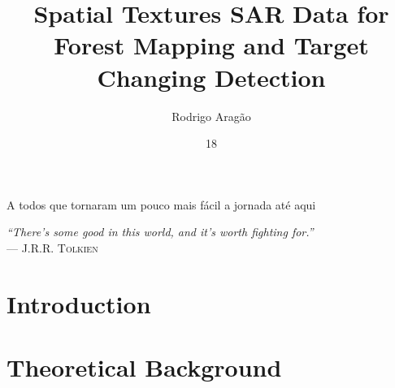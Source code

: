 \documentclass[msc, eng]{ita}    %
\author{Rodrigo Aragão}{Santos}
\title{Spatial Textures SAR Data for Forest Mapping and Target Changing Detection}
\date{18}{Novembro}{2020}
\begin{document}
\maketitle %

\begin{itadedication}
A todos que tornaram um pouco mais fácil a jornada até aqui
\end{itadedication}

\begin{itathanks}

\end{itathanks}

\thispagestyle{empty}
\ifhyperref{}\fi
\begin{flushright}
\begin{spacing}{1}
\mbox{}\vfill
{\sffamily\itshape
``There’s some good in this world, and it’s worth fighting for.''\\}
--- \textsc{J.R.R. Tolkien}
\end{spacing}
\end{flushright}

\begin{abstract}
\noindent

\end{abstract}

\begin{englishabstract}
\noindent

\end{englishabstract}

\listoffigures %


\listofabbreviations


\tableofcontents

\mainmatter
\chapter{Introduction}


\chapter{Theoretical Background}
\label{cap:intro}

\end{document}
